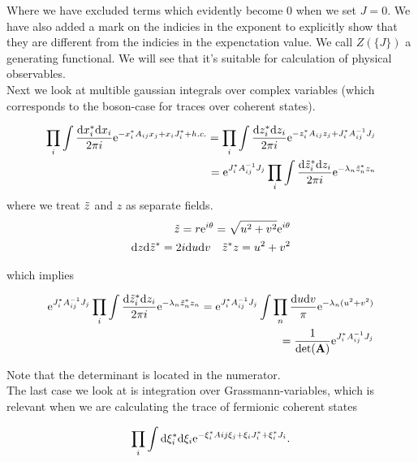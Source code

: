 Where we have excluded terms which evidently become $0$ when we set $J = 0$. We have also added a mark on the indicies in the exponent to explicitly show that they are different from the indicies in the expenctation value. We call $Z(\{J\})$ a generating functional. We will see that it's suitable for calculation of physical observables. \\

Next we look at multible gaussian integrals over complex variables (which corresponds to the boson-case for traces over coherent states). 

\begin{align*}
    \prod_{i} \int \frac{\dd x_{i}^{*}\dd x_{i}}{2\pi i}\mathrm{e}^{-x_{i}^{*}A_{ij}x_{j} + x_{i}J_{i}^{*} + h.c.} = \prod_{i} \int \frac{\dd z_{i}^{*}\dd z_{i}}{2\pi i}\mathrm{e}^{-z_{i}^{*}A_{ij}z_{j} + J_{i}^{*}A_{ij}^{-1}J_{j}} \\ = \mathrm{e}^{J_{i}^{*}A_{ij}^{-1}J_{j}} \prod_{i} \int \frac{\dd \Tilde{z}_{i}^{*}\dd z_{i}}{2\pi i} \mathrm{e}^{-\lambda_{n} \Tilde{z}_{n}^{*}z_{n}}
\end{align*}
where we treat $\Tilde{z}$ and $z$ as separate fields.
\begin{align*}
    \Tilde{z} = r \mathrm{e}^{i\theta} = \sqrt{u^{2} + v^{2}}\mathrm{e}^{i\theta} \\ \dd z \dd \Tilde{z}^{*} = 2i\dd u \dd v \quad \Tilde{z}^{*} z = u^{2} + v^{2} 
\end{align*}

which implies 

\begin{align}
    \mathrm{e}^{J_{i}^{*}A_{ij}^{-1}J_{j}} \prod_{i} \int \frac{\dd \Tilde{z}_{i}^{*}\dd z_{i}}{2\pi i} \mathrm{e}^{-\lambda_{n} \Tilde{z}_{n}^{*}z_{n}} = \mathrm{e}^{J_{i}^{*}A_{ij}^{-1}J_{j}} \int \prod_{n} \frac{\dd u \dd v}{\pi} \mathrm{e}^{-\lambda_{n} (u^{2} + v^{2})} \nonumber \\ = \frac{1}{\det(\vb{A})} \mathrm{e}^{J_{i}^{*}A_{ij}^{-1}J_{j}}
\end{align}

Note that the determinant is located in the numerator. \\ 

The last case we look at is integration over Grassmann-variables, which is relevant when we are calculating the trace of fermionic coherent states

\begin{align*}
    \prod_{i} \int \dd \xi_{i}^{*} \dd \xi_{i} \mathrm{e}^{-\xi_{i}^{*}A{ij} \xi_{j} + \xi_{i}J_{i}^{*} + \xi_{i}^{*}J_{i}}.
\end{align*}

